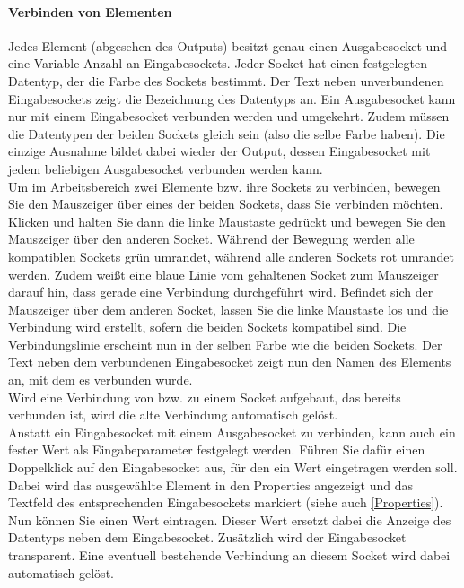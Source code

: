 \paragraph{Verbinden von Elementen}
Jedes Element (abgesehen des Outputs) besitzt genau einen Ausgabesocket und eine Variable Anzahl an Eingabesockets. Jeder Socket hat einen festgelegten Datentyp, der die Farbe des Sockets bestimmt. Der Text neben unverbundenen Eingabesockets zeigt die Bezeichnung des Datentyps an. Ein Ausgabesocket kann nur mit einem Eingabesocket verbunden werden und umgekehrt. Zudem m\"ussen die Datentypen der beiden Sockets gleich sein (also die selbe Farbe haben). Die einzige Ausnahme bildet dabei wieder der Output, dessen Eingabesocket mit jedem beliebigen Ausgabesocket verbunden werden kann.
\\
Um im Arbeitsbereich zwei Elemente bzw. ihre Sockets zu verbinden, bewegen Sie den Mauszeiger \"uber eines der beiden Sockets, dass Sie verbinden m\"ochten. Klicken und halten Sie dann die linke Maustaste gedr\"uckt und bewegen Sie den Mauszeiger \"uber den anderen Socket. W\"ahrend der Bewegung werden alle kompatiblen Sockets gr\"un umrandet, w\"ahrend alle anderen Sockets rot umrandet werden. Zudem wei{\ss}t eine blaue Linie vom gehaltenen Socket zum Mauszeiger darauf hin, dass gerade eine Verbindung durchgef\"uhrt wird. Befindet sich der Mauszeiger \"uber dem anderen Socket, lassen Sie die linke Maustaste los und die Verbindung wird erstellt, sofern die beiden Sockets kompatibel sind. Die Verbindungslinie erscheint nun in der selben Farbe wie die beiden Sockets. Der Text neben dem verbundenen Eingabesocket zeigt nun den Namen des Elements an, mit dem es verbunden wurde.
\\
Wird eine Verbindung von bzw. zu einem Socket aufgebaut, das bereits verbunden ist, wird die alte Verbindung automatisch gel\"ost.
\\
Anstatt ein Eingabesocket mit einem Ausgabesocket zu verbinden, kann auch ein fester Wert als Eingabeparameter festgelegt werden. F\"uhren Sie daf\"ur einen Doppelklick auf den Eingabesocket aus, f\"ur den ein Wert eingetragen werden soll. Dabei wird das ausgew\"ahlte Element in den Properties angezeigt und das Textfeld des entsprechenden Eingabesockets markiert (siehe auch \ref{Properties}). Nun k\"onnen Sie einen Wert eintragen. Dieser Wert ersetzt dabei die Anzeige des Datentyps neben dem Eingabesocket. Zus\"atzlich wird der Eingabesocket transparent. Eine eventuell bestehende Verbindung an diesem Socket wird dabei automatisch gel\"ost.

